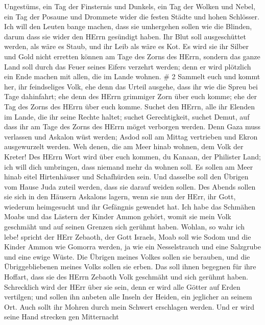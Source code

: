 Ungestüms, ein Tag der Finsternis und Dunkels, ein Tag der Wolken und
Nebel,  ein Tag der Posaune und Drommete wider die festen
Städte und hohen Schlösser.  Ich will den Leuten bange
machen, dass sie umhergehen sollen wie die Blinden, darum dass sie wider
den HErrn gesündigt haben. Ihr Blut soll ausgeschüttet werden, als wäre
es Staub, und ihr Leib als wäre es Kot.  Es wird sie ihr
Silber und Gold nicht erretten können am Tage des Zorns des HErrn,
sondern das ganze Land soll durch das Feuer seines Eifers verzehrt
werden; denn er wird plötzlich ein Ende machen mit allen, die im Lande
wohnen. \# 2  Sammelt euch und kommt her, ihr feindseliges
Volk,  ehe denn das Urteil ausgehe, dass ihr wie die Spreu
bei Tage dahinfahrt; ehe denn des HErrn grimmiger Zorn über euch komme;
ehe der Tag des Zorns des HErrn über euch komme.  Suchet den
HErrn, alle ihr Elenden im Lande, die ihr seine Rechte haltet; suchet
Gerechtigkeit, suchet Demut, auf dass ihr am Tage des Zorns des HErrn
möget verborgen werden.  Denn Gaza muss verlassen und
Askalon wüst werden; Asdod soll am Mittag vertrieben und Ekron
ausgewurzelt werden.  Weh denen, die am Meer hinab wohnen,
dem Volk der Kreter! Des HErrn Wort wird über euch kommen, du Kanaan,
der Philister Land; ich will dich umbringen, dass niemand mehr da wohnen
soll.  Es sollen am Meer hinab eitel Hirtenhäuser und
Schafhürden sein.  Und dasselbe soll den Übrigen vom Hause
Juda zuteil werden, dass sie darauf weiden sollen. Des Abends sollen sie
sich in den Häusern Askalons lagern, wenn sie nun der HErr, ihr Gott,
wiederum heimgesucht und ihr Gefängnis gewendet hat.  Ich
habe das Schmähen Moabs und das Lästern der Kinder Ammon gehört, womit
sie mein Volk geschmäht und auf seinen Grenzen sich gerühmt haben.
 Wohlan, so wahr ich lebe! spricht der HErr Zebaoth, der
Gott Israels, Moab soll wie Sodom und die Kinder Ammon wie Gomorra
werden, ja wie ein Nesselstrauch und eine Salzgrube und eine ewige
Wüste. Die Übrigen meines Volkes sollen sie berauben, und die
Übriggebliebenen meines Volks sollen sie erben.  Das soll
ihnen begegnen für ihre Hoffart, dass sie des HErrn Zebaoth Volk
geschmäht und sich gerühmt haben.  Schrecklich wird der
HErr über sie sein, denn er wird alle Götter auf Erden vertilgen; und
sollen ihn anbeten alle Inseln der Heiden, ein jeglicher an seinem Ort.
 Auch sollt ihr Mohren durch mein Schwert erschlagen
werden.  Und er wird seine Hand strecken gen Mitternacht

